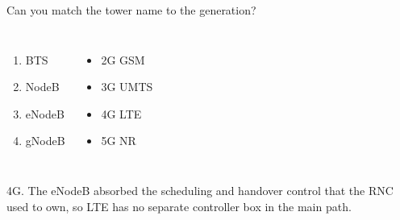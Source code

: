 \begin{frame}{Can you match the tower name to the generation?}
  \vspace{0.5em}
  \begin{columns}[T,onlytextwidth]
      \large
      \begin{enumerate}\itemsep4pt
        \item BTS
        \item NodeB
        \item eNodeB
        \item gNodeB
      \end{enumerate}
      \large
      \begin{itemize}\itemsep4pt
        \item 2G GSM
        \item 3G UMTS
        \item 4G LTE
        \item 5G NR
      \end{itemize}
  \end{columns}


  \vspace{0.9em}
     {4G. The eNodeB absorbed the scheduling and handover control that the RNC
      used to own, so LTE has no separate controller box in the main path.}
\end{frame}


